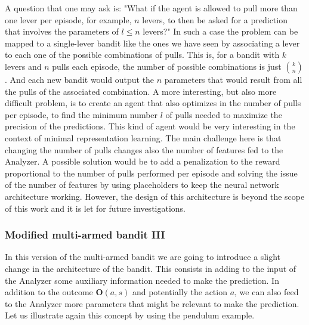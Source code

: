 \documentclass[11pt,a4paper,twoside]{report}
\newcommand{\+}{\textnormal{+} }
\theoremstyle{definition}
\numberwithin{equation}{chapter}
\begin{document}
    A question that one may ask is: "What if the agent is allowed to pull more
    than one lever per episode, for example, $n$ levers, to then be asked for a
    prediction that involves the parameters of $l\leq n$ levers?" In such a case
    the problem can be mapped to a single-lever bandit like the ones we have
    seen by associating a lever to each one of the possible combinations of
    pulls. This is, for a bandit with $k$ levers and $n$ pulls each episode, the
    number of possible combinations is just $k\choose n$.  And each new bandit
    would output the $n$ parameters that would result from all the pulls of the
    associated combination. A more interesting, but also more difficult problem,
    is to create an agent that also optimizes in the number of pulls per
    episode, to find the minimum number $l$ of pulls needed to maximize the
    precision of the predictions. This kind of agent would be very interesting
    in the context of minimal representation learning. The main challenge here
    is that changing the number of pulls changes also the number of features
    fed to the Analyzer. A possible solution would be to add a penalization
    to the reward proportional to the number of pulls performed per episode and
    solving the issue of the number of features by using placeholders to keep
    the neural network architecture working. However, the design of this
    architecture is beyond the scope of this work and it is let for future
    investigations.

  \subsubsection{Modified multi-armed bandit III}

  In this version of the multi-armed bandit we are going to introduce a 
  slight change in the architecture of the bandit. This consists in adding
  to the input of the Analyzer some auxiliary information needed to make
  the prediction. In addition to the outcome $\textbf{O}(a,s)$ and potentially
  the action $a$, we can also feed to the Analyzer more parameters that 
  might be relevant to make the prediction. Let us illustrate again this
  concept by using the pendulum example.
\end{document}
